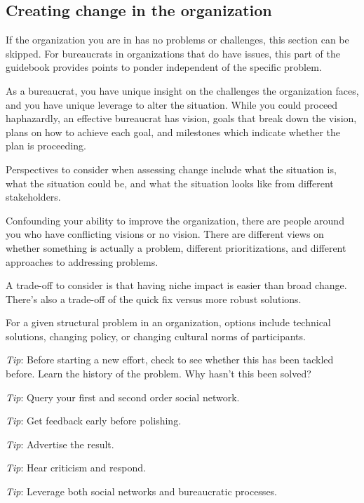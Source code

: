 \subsection{Creating change in the organization\label{sec:creating_change}}

If the organization you are in has no problems or challenges, this section can be skipped. For bureaucrats in organizations that do have issues, this part of the guidebook provides points to ponder independent of the specific problem.

As a bureaucrat, you have unique insight on the challenges the organization faces, and you have unique leverage to alter the situation.  While you could proceed haphazardly, an effective bureaucrat has vision, goals that break down the vision, plans on how to achieve each goal, and milestones which indicate whether the plan is proceeding. 

Perspectives to consider when assessing change include what the situation is, what the situation could be, and what the situation looks like from different stakeholders.

Confounding your ability to improve the organization, there are people around you who have conflicting visions or no vision. There are different views on whether something is actually a problem, different prioritizations, and different approaches to addressing problems.

A trade-off to consider is that having niche impact is easier than broad change. There's also a trade-off of the quick fix versus more robust solutions.

For a given structural problem in an organization, options include technical solutions, changing policy, or changing cultural norms of participants.


\textit{Tip}: Before starting a new effort, check to see whether this has been tackled before.
Learn the history of the problem. Why hasn't this been solved?

\textit{Tip}: Query your first and second order social network.

\textit{Tip}: Get feedback early  before polishing.

\textit{Tip}: Advertise the result.

\textit{Tip}: Hear criticism and respond.

\textit{Tip}: Leverage both social networks and bureaucratic processes. 

